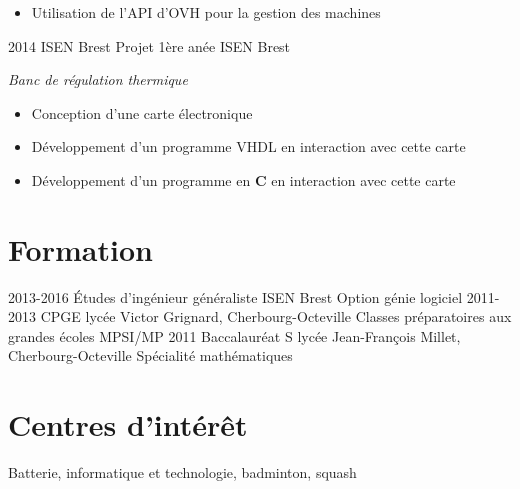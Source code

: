 \documentclass[]{friggeri-cv}
\begin{document}
\begin{entrylist}
{\begin{itemize}
      \item Utilisation de l'API d'OVH pour la gestion des machines
    \end{itemize}}
  \entry
    {2014}
    {ISEN Brest}
    {Projet 1ère anée ISEN Brest}
    {\emph{Banc de régulation thermique}
    \begin{itemize}
      \item Conception d'une carte électronique
      \item Développement d'un programme VHDL en interaction avec cette carte
      \item Développement d'un programme en \textbf{C} en interaction avec cette carte
    \end{itemize}}
\end{entrylist}

\section{Formation}

\begin{entrylist}
  \entry
    {2013-2016}
    {Études d'ingénieur généraliste}
    {ISEN Brest}
    {Option génie logiciel}
  \entry
    {2011-2013}
    {CPGE}
    {lycée Victor Grignard, Cherbourg-Octeville}
    {Classes préparatoires aux grandes écoles MPSI/MP}
  \entry
    {2011}
    {Baccalauréat S}
    {lycée Jean-François Millet, Cherbourg-Octeville}
    {Spécialité mathématiques}
\end{entrylist}

\section{Centres d'intérêt}

Batterie, informatique et technologie, badminton, squash
\end{document}
